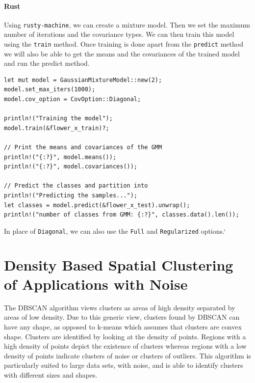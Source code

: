 \documentclass{book}
\begin{document}
\paragraph{Rust}%
Using \lstinline{rusty-machine}, we can create a mixture model. Then we set the maximum number of iterations and the covariance types. We can then train this model using the \lstinline{train} method. Once training is done apart from the \lstinline{predict} method we will also be able to get the means and the covariances of the trained model and run the predict method.

\begin{lstlisting}[caption={rusty\_machine\_unsupervised},basicstyle=\small]
let mut model = GaussianMixtureModel::new(2);
model.set_max_iters(1000);
model.cov_option = CovOption::Diagonal;

println!("Training the model");
model.train(&flower_x_train)?;

// Print the means and covariances of the GMM
println!("{:?}", model.means());
println!("{:?}", model.covariances());

// Predict the classes and partition into
println!("Predicting the samples...");
let classes = model.predict(&flower_x_test).unwrap();
println!("number of classes from GMM: {:?}", classes.data().len());
\end{lstlisting}

In place of \lstinline{Diagonal}, we can also use the \lstinline{Full} and \lstinline{Regularized} options.`
\label{par:rust}



\label{sec:gaussian_mixture_model}

\section{Density Based Spatial Clustering of Applications with Noise}%
The DBSCAN algorithm views clusters as areas of high density separated by areas of low density. Due to this generic view, clusters found by DBSCAN can have any shape, as opposed to k-means which assumes that clusters are convex shape. Clusters are identified by looking at the density of points. Regions with a high density of points depict the existence of clusters whereas regions with a low density of points indicate clusters of noise or clusters of outliers. This algorithm is particularly suited to large data sets, with noise, and is able to identify clusters with different sizes and shapes.
\end{document}
